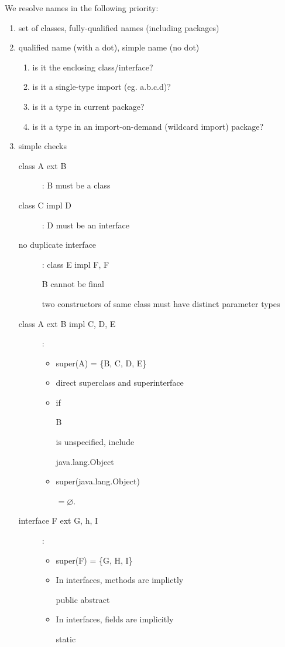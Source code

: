 \documentclass[12pt]{article}
\begin{document}
We resolve names in the following priority:
\begin{enumerate}
    \item set of classes, fully-qualified names (including packages)
    \item qualified name (with a dot), simple name (no dot)
    \begin{enumerate}
        \item is it the enclosing class/interface?
        \item is it a single-type import (eg. a.b.c.d)?
        \item is it a type in current package?
        \item is it a type in an import-on-demand (wildcard import) package?
    \end{enumerate}
    \item simple checks
    \begin{description}
        \item[class A ext B]: B must be a class
        \item[class C impl D]: D must be an interface
        \item[no duplicate interface]: class E impl F, F
        \item[] B cannot be final
        \item[] two constructors of same class must have distinct parameter types
        \item[class A ext B impl C, D, E]:
        \begin{itemize}
            \item \begin{code}super(A) = \{B, C, D, E\}\end{code}
            \item direct superclass and superinterface
            \item if \begin{code}B\end{code} is unspecified, include \begin{code}java.lang.Object\end{code}
            \item \begin{code}super(java.lang.Object)\end{code} $= \varnothing$.
        \end{itemize}
        \item[interface F ext G, h, I]:
        \begin{itemize}
            \item \begin{code}super(F) = \{G, H, I\}\end{code}
            \item In interfaces, methods are implictly \begin{code}public abstract\end{code}
            \item In interfaces, fields are implicitly \begin{code}static\end{code}
        \end{itemize}
    \end{description}
\end{enumerate}
\end{document}
